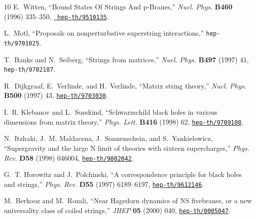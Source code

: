 \begin{thebibliography}{10}
E.~Witten, ``Bound States Of Strings And p-Branes,'' {\em Nucl. Phys.} {\bf
  B460} (1996) 335--350, \href{http://xxx.lanl.gov/abs/hep-th/9510135}{{\tt
  hep-th/9510135}}.

  L.~Motl, ``Proposals on nonperturbative superstring interactions,''
  {\tt hep-th\slash 9701025}.

T.~Banks and N.~Seiberg, ``Strings from matrices,'' {\em Nucl. Phys.} 
  {\bf B497} (1997) 41, {\tt hep-th/9702187}.

R.~Dijkgraaf, E.~Verlinde, and H.~Verlinde, ``Matrix string theory,'' {\em
  Nucl. Phys.} {\bf B500} (1997) 43,
  \href{http://xxx.lanl.gov/abs/hep-th/9703030}{{\tt hep-th/9703030}}.

I.~R. Klebanov and L.~Susskind, ``Schwarzschild black holes in various
  dimensions from matrix theory,'' {\em Phys. Lett.} {\bf B416} (1998) 62,
  \href{http://xxx.lanl.gov/abs/hep-th/9709108}{{\tt hep-th/9709108}}.

N.~Itzhaki, J.~M. Maldacena, J.~Sonnenschein, and S.~Yankielowicz,
  ``Supergravity and the large N limit of theories with sixteen supercharges,''
  {\em Phys. Rev.} {\bf D58} (1998) 046004,
  \href{http://xxx.lanl.gov/abs/hep-th/9802042}{{\tt hep-th/9802042}}.

G.~T. Horowitz and J.~Polchinski, ``A correspondence principle for black holes
  and strings,'' {\em Phys. Rev.} {\bf D55} (1997) 6189--6197,
  \href{http://xxx.lanl.gov/abs/hep-th/9612146}{{\tt hep-th/9612146}}.

M.~Berkooz and M.~Rozali, ``Near Hagedorn dynamics of NS fivebranes, or a new
  universality class of coiled strings,'' {\em JHEP} {\bf 05} (2000) 040,
  \href{http://xxx.lanl.gov/abs/hep-th/0005047}{{\tt hep-th/0005047}}.

\end{thebibliography}\endgroup



